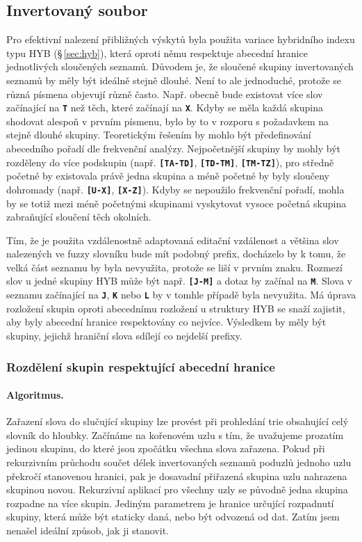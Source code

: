 \documentclass[11pt,letterpaper,oneside,openright]{book}
\newcommand{\bftt}[1]{\texttt{\textbf{#1}}}
\begin{document}
\subsection{Invertovaný soubor}
Pro efektivní nalezení přibližných výskytů byla použita variace hybridního
indexu typu HYB (\S\,\ref{sec:hyb}), která oproti němu respektuje abecední
hranice jednotlivých sloučených seznamů. Důvodem je, že sloučené skupiny
invertovaných seznamů by měly být ideálně stejně dlouhé. Není to ale
jednoduché, protože se různá písmena objevují různě často. Např. obecně bude
existovat více slov začínající na \bftt{T} než těch, které začínají na
\bftt{X}. Kdyby se měla každá skupina shodovat alespoň v prvním písmenu, bylo
by to v rozporu s požadavkem na stejně dlouhé skupiny. Teoretickým řešením by
mohlo být předefinování abecedního pořadí dle frekvenční analýzy. Nejpočetnější
skupiny by mohly být rozděleny do více podskupin (např. \bftt{[TA-TD]},
\bftt{[TD-TM]}, \bftt{[TM-TZ]}), pro středně početné by existovala právě jedna
skupina a méně početné by byly sloučeny dohromady (např. \bftt{[U-X]},
\bftt{[X-Z]}). Kdyby se nepoužilo frekvenční pořadí, mohla by se totiž mezi méně
početnými skupinami vyskytovat vysoce početná skupina zabraňující sloučení těch
okolních.

Tím, že je použita vzdálenostně adaptovaná editační vzdálenost a většina slov
nalezených ve fuzzy slovníku bude mít podobný prefix, docházelo by k tomu, že
velká část seznamu by byla nevyužita, protože se liší v prvním znaku. Rozmezí
slov u jedné skupiny HYB může být např. \bftt{[J-M]} a dotaz by začínal na
\bftt{M}. Slova v seznamu začínající na \bftt{J}, \bftt{K} nebo \bftt{L} by v
tomhle případě byla nevyužita. Má úprava rozložení skupin oproti abecednímu
rozložení u struktury HYB se snaží zajistit, aby byly abecední hranice
respektovány co nejvíce. Výsledkem by měly být skupiny, jejichž hraniční slova
sdílejí co nejdelší prefixy.

\subsubsection{Rozdělení skupin respektující abecední hranice}
\label{sec:hybrid_algorithm} \paragraph{Algoritmus.} Zařazení slova do
slučující skupiny lze provést při prohledání trie obsahující celý slovník do
hloubky. Začínáme na kořenovém uzlu s tím, že uvažujeme prozatím jedinou
skupinu, do které jsou zpočátku všechna slova zařazena.  Pokud při rekurzivním
průchodu součet délek invertovaných seznamů poduzlů jednoho uzlu překročí
stanovenou hranici, pak je dosavadní přiřazená skupina uzlu nahrazena skupinou
novou. Rekurzivní aplikací pro všechny uzly se původně jedna skupina rozpadne
na více skupin. Jediným parametrem je hranice určující rozpadnutí skupiny,
která může být staticky daná, nebo být odvozená od dat. Zatím jsem nenašel
ideální způsob, jak ji stanovit.
\end{document}
